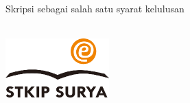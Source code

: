 \begin{titlepage}
\begin{center}

{\Large\bfseries%
\scshape\ttitle\par}\vspace{0.4cm} %
\vfill
{\Large \penulisTulis \\[2mm] \nimTulis }\\
 \vspace{0.4cm}
\vfill

{\large {} \selectfont Skripsi sebagai salah satu syarat kelulusan\\[1.5mm] \degreename\\ %
}
\vfill

\includegraphics[width=0.3\textwidth]{logoSTKIP-transparent.png}\\ 
\vfill
{\large \prodiTulis}\\ [2mm]
{\large {} \selectfont  \institusiTulis}\\  [2mm]
{%
  \large {}\selectfont  \addressname}\\  [2mm]
{\large {}\selectfont  \tahunTulis}

\end{center}
\end{titlepage}

